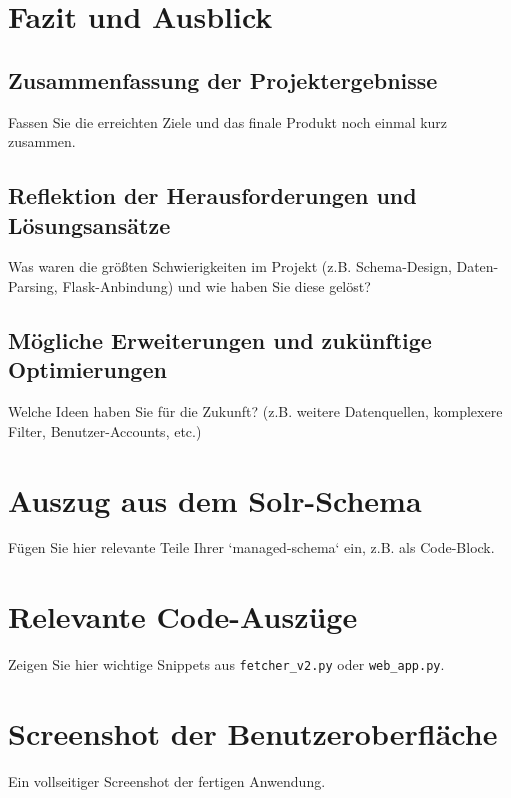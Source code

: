 \section{Fazit und Ausblick}
\label{chap:fazit}

\subsection{Zusammenfassung der Projektergebnisse}
\label{sec:fazit_zusammenfassung}
Fassen Sie die erreichten Ziele und das finale Produkt noch einmal kurz zusammen.

\subsection{Reflektion der Herausforderungen und Lösungsansätze}
\label{sec:fazit_herausforderungen}
Was waren die größten Schwierigkeiten im Projekt (z.B. Schema-Design, Daten-Parsing, Flask-Anbindung) und wie haben Sie diese gelöst?

\subsection{Mögliche Erweiterungen und zukünftige Optimierungen}
\label{sec:fazit_ausblick}
Welche Ideen haben Sie für die Zukunft? (z.B. weitere Datenquellen, komplexere Filter, Benutzer-Accounts, etc.)




\appendix %
\section{Auszug aus dem Solr-Schema}
\label{app:solr_schema}
Fügen Sie hier relevante Teile Ihrer `managed-schema` ein, z.B. als Code-Block.

\section{Relevante Code-Auszüge}
\label{app:code}
Zeigen Sie hier wichtige Snippets aus \texttt{fetcher\_v2.py} oder \texttt{web\_app.py}.

\section{Screenshot der Benutzeroberfläche}
\label{app:screenshot}
Ein vollseitiger Screenshot der fertigen Anwendung.